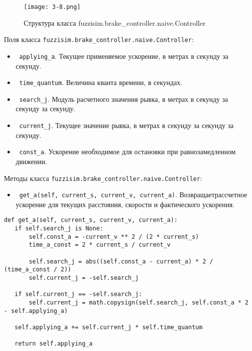 \begin{figure}[ht]
	\centering
	\texttt{[image: 3-8.png]}
	\caption{ Структура класса fuzzisim.brake\_controller.naive.Controller}
\end{figure}

Поля класса \lstinline!fuzzisim.brake_controller.naive.Controller!:
\begin{itemize}
	\item \lstinline! applying_a!. Текущее применяемое ускорение, в метрах в секунду за секунду.
	\item \lstinline! time_quantum!. Величина кванта времени, в секундах.
	\item \lstinline! search_j!. Модуль расчетного значения рывка, в метрах в секунду за секунду за секунду.
	\item \lstinline! current_j!. Текущее значение рывка, в метрах в секунду за секунду за секунду.
	\item \lstinline! const_a!. Ускорение необходимое для остановки при равнозамедленном движении.
\end{itemize}


Методы класса \lstinline!fuzzisim.brake_controller.naive.Controller!:
\begin{itemize}
	\item \lstinline! get_a(self, current_s, current_v, current_a)!. Возвращаетрассчетное ускорение для текущих расстояния, скорости и фактического ускорения.
\end{itemize}

\begin{lstlisting}[style=pythonstyle,caption={  }, label=lst:func:1]
def get_a(self, current_s, current_v, current_a):
   if self.search_j is None:
       self.const_a = -current_v ** 2 / (2 * current_s)
       time_a_const = 2 * current_s / current_v

       self.search_j = abs((self.const_a - current_a) * 2 / (time_a_const / 2))
       self.current_j = -self.search_j

   if self.current_j == -self.search_j:
       self.current_j = math.copysign(self.search_j, self.const_a * 2 - self.applying_a)

   self.applying_a += self.current_j * self.time_quantum

   return self.applying_a
\end{lstlisting}



